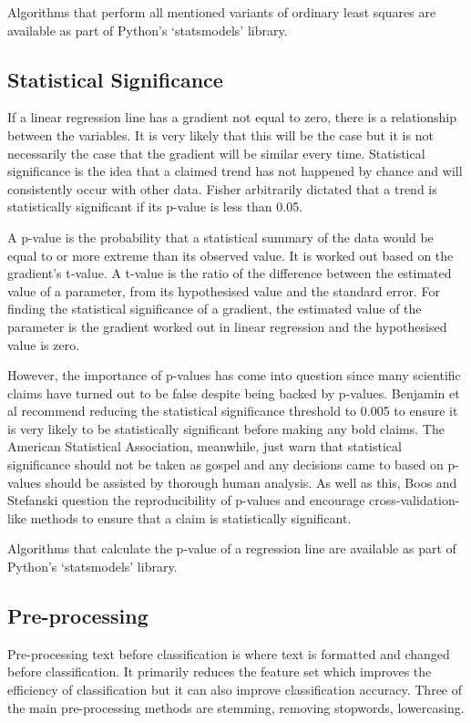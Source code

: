 			Algorithms that perform all mentioned variants of ordinary least squares are available as part of Python's `statsmodels' library.
		\subsection{Statistical Significance}\label{sec:eval-statsig}
			If a linear regression line has a gradient not equal to zero, there is a relationship between the variables. It is very likely that this will be the case but it is not necessarily the case that the gradient will be similar every time. Statistical significance is the idea that a claimed trend has not happened by chance and will consistently occur with other data. Fisher arbitrarily dictated that a trend is statistically significant if its p-value is less than 0.05\cite{stats_research_fisher}.
			
			A p-value is the probability that a statistical summary of the data would be equal to or more extreme than its observed value\cite{statement_p_wasserstein}. It is worked out based on the gradient's t-value. A t-value is the ratio of the difference between the estimated value of a parameter, from its hypothesised value and the standard error. For finding the statistical significance of a gradient, the estimated value of the parameter is the gradient worked out in linear regression and the hypothesised value is zero.  

			However, the importance of p-values has come into question since many scientific claims have turned out to be false despite being backed by p-values. Benjamin et al recommend reducing the statistical significance threshold to 0.005 to ensure it is very likely to be statistically significant before making any bold claims\cite{redefine_statsig_benjamin}. The American Statistical Association, meanwhile, just warn that statistical significance should not be taken as gospel and any decisions came to based on p-values should be assisted by thorough human analysis\cite{statement_p_wasserstein}. As well as this, Boos and Stefanski question the reproducibility of p-values and encourage cross-validation-like methods to ensure that a claim is statistically significant\cite{p_reproducibility_boos}. 
			
			Algorithms that calculate the p-value of a regression line are available as part of Python's `statsmodels' library.
		\subsection{Pre-processing}
			Pre-processing text before classification is where text is formatted and changed before classification. It primarily reduces the feature set which improves the efficiency of classification but it can also improve classification accuracy. Three of the main pre-processing methods are stemming, removing stopwords, lowercasing.
			
